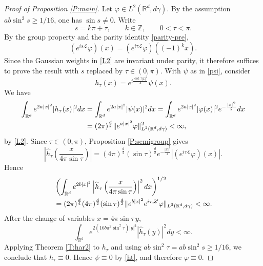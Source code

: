 \documentclass[11pt,a4paper]{amsart}
\def \vf{\varphi}
\newcommand{\Rm}{\mathbb R^d}
\numberwithin{equation}{section}
\numberwithin{equation}{section}
\begin{document}
\begin{proof}[Proof of Proposition \ref{P:main}]
Let $\vf\in L^2(\Rm,d\gamma)$. By the assumption
$ab\sin^2s\geq 1/16$, one has $\sin s\neq0$. Write
\[
s=k\pi+\tau,
\qquad k\in\mathbb Z,
\qquad 0<\tau<\pi.
\]
By the group property and the parity identity \eqref{parity-pre},
\[
(e^{is\mathscr L}\vf)(x)
=(e^{i\tau\mathscr L}\vf)((-1)^k x).
\]
Since the Gaussian weights in \eqref{L2} are invariant under parity,
it therefore suffices to prove the result with $s$ replaced by
$\tau\in(0,\pi)$. With $\psi$ as in \eqref{psi}, consider
\begin{equation}\label{ht}
h_\tau(x)=e^{i\frac{\cot\tau |x|^2}{4}}\psi(x).
\end{equation}
We have
\begin{align}\label{one}
\int_{\Rm}e^{2a|x|^2}|h_\tau(x)|^2dx
&=\int_{\Rm}e^{2a|x|^2}|\psi(x)|^2dx
=\int_{\Rm}e^{2a|x|^2}|\vf(x)|^2e^{-\frac{|x|^2}{2}}dx
\\
&=(2\pi)^{\frac d2}\|e^{a|x|^2}\vf\|^2_{L^2(\Rm,d\gamma)}<\infty,
\notag
\end{align}
by \eqref{L2}. Since $\tau\in(0,\pi)$, Proposition \ref{P:semigroup}
gives
\begin{equation*}
\left|\widehat h_\tau\left(\frac{x}{4\pi\sin\tau}\right)\right|
=(4\pi)^{\frac d2}(\sin\tau)^{\frac d2}
e^{-\frac{|x|^2}{4}}|(e^{i\tau\mathscr L}\vf)(x)|.
\end{equation*}
Hence
\begin{align}\label{beauty}
&\left(\int_{\Rm}e^{2b|x|^2}
\left|\widehat h_\tau\left(\frac{x}{4\pi\sin\tau}\right)\right|^2dx\right)^{1/2}
\\
&=(2\pi)^{\frac d4}(4\pi)^{\frac d2}(\sin\tau)^{\frac d2}
\|e^{b|x|^2}e^{i\tau\mathscr L}\vf\|_{L^2(\Rm,d\gamma)}<\infty.
\notag
\end{align}
After the change of variables $x=4\pi\sin\tau\,y$,
\begin{equation}\label{nik}
\int_{\Rm}e^{2(16b\pi^2\sin^2\tau)|y|^2}
|\widehat h_\tau(y)|^2dy<\infty.
\end{equation}
Applying Theorem \ref{T:har2} to $h_\tau$ and using
$ab\sin^2\tau=ab\sin^2s\geq1/16$, we conclude that
$h_\tau\equiv0$. Hence $\psi\equiv0$ by \eqref{ht}, and therefore
$\vf\equiv0$.
\end{proof}





\end{document}
